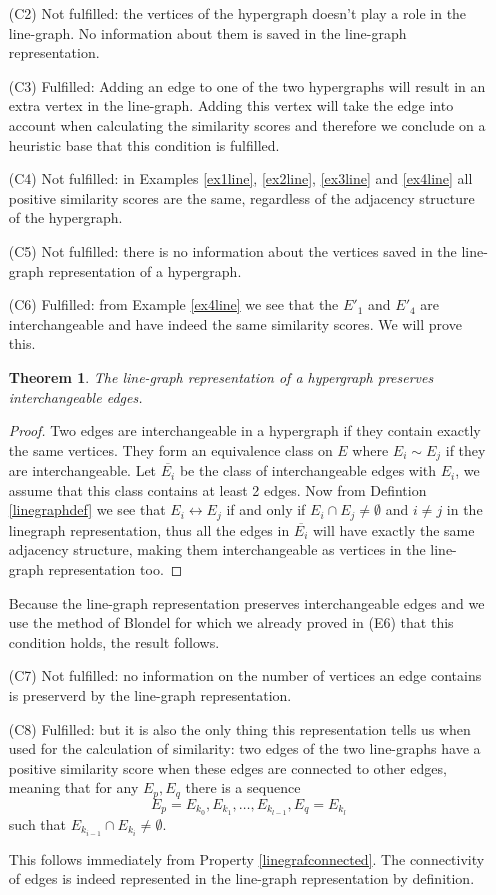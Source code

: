 \documentclass[a4paper,11pt]{report}
\newtheorem{theorem}{Theorem}[section]
\begin{document}
\begin{itemize}
 
   \item[(C2)] Not fulfilled: the vertices of the hypergraph doesn't play a role 
   in the line-graph. No information about them is saved in the line-graph 
   representation.
  \item[(C3)] Fulfilled: Adding an edge to one of the two hypergraphs will 
  result in an extra vertex in the line-graph. Adding this vertex will take the 
  edge into account when calculating the similarity scores and therefore we 
  conclude on a heuristic base that this condition is fulfilled.
  \item[(C4)] Not fulfilled: in Examples \ref{ex1line}, \ref{ex2line}, \ref{ex3line}  
  and \ref{ex4line}
  all positive similarity scores are the same, regardless of the adjacency 
  structure of the hypergraph.
  \item[(C5)] Not fulfilled: there is no information about the vertices saved in 
  the line-graph representation of a hypergraph.
  \item[(C6)] Fulfilled: from Example \ref{ex4line} we see that the $E'_1$ and 
 $E'_4$ are interchangeable and have indeed the same similarity scores. We will 
 prove this.
 
 \begin{theorem}
   The line-graph representation of a hypergraph preserves interchangeable 
   edges.
 \end{theorem}
 \begin{proof}
   Two edges are interchangeable in a hypergraph if they contain exactly the same 
   vertices. They form an equivalence class on $E$ where $E_i \sim E_j$ if they 
   are interchangeable. Let $\overline{E_i}$ be the class of interchangeable 
   edges with $E_i$, we assume that this class contains at least 2 edges. Now from Defintion \ref{linegraphdef} we see that
   $E_i \leftrightarrow E_j$ if and only if $E_i \cap E_j \not = \emptyset$ and $i \not = j$ 
   in the linegraph representation, thus all the edges in $\overline{E_i}$ will 
   have exactly the same adjacency structure, making them interchangeable as vertices in the 
   line-graph representation too.
 \end{proof}
 Because the line-graph representation preserves interchangeable edges and we use the method of Blondel for which we already proved
 in (E6) that this condition holds, the result follows.
     \item[(C7)] Not fulfilled: no information on the number of vertices an edge 
contains is preserverd by the line-graph representation.
  \item[(C8)] Fulfilled: but it is also the only thing this representation tells us 
  when used for the calculation of similarity: two edges of the two line-graphs
  have a positive similarity score when these edges are connected to other edges, meaning that for any $E_p, E_q$ there is a sequence 
  $$E_p = E_{k_0}, E_{k_1}, \ldots, E_{k_{l-1}}, E_q = E_{k_l}$$
  such that $E_{k_{i-1}} \cap E_{k_i} \not = \emptyset$. 
  
  
 This follows immediately from  Property \ref{linegrafconnected}. The connectivity 
  of edges is indeed represented in the line-graph representation by definition. 
  

  \end{itemize}  
\end{document}
